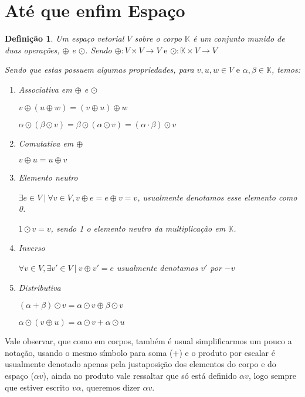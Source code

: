 \documentclass{article}
\newtheorem{definition}{Definição}[section]
\newcommand{\KK}{\mathbb{K} }
\begin{document}
\section{Até que enfim Espaço}

\begin{definition}

Um espaço vetorial $V$ sobre o corpo $\KK$ é um conjunto munido de duas operações, $\oplus$ e $\odot$. Sendo $\oplus: V \times V \to V \text{ e } \odot: \KK \times V \to V$



Sendo que estas possuem algumas propriedades, para $v,u,w \in V \text{ e } \alpha, \beta \in \KK$, temos:

\begin{enumerate}
    \item Associativa em $\oplus$ e $\odot$
    
        $v \oplus (u \oplus w) = (v \oplus u) \oplus w $
        
        $\alpha \odot (\beta \odot v) = \beta \odot (\alpha \odot v) = (\alpha \cdot \beta)\odot v$
    \item Comutativa em $\oplus$
    
        $v \oplus u = u \oplus v$
    \item Elemento neutro
    
     $\exists e \in V \ | \  \forall v \in V, v \oplus e = e \oplus v = v$, usualmente denotamos esse elemento como 0.
     
     $1 \odot v = v$, sendo 1 o elemento neutro da multiplicação em $\KK$.
     
     \item Inverso
     
     $\forall v \in V , \exists v' \in V \ | \ v \oplus v' = e$ usualmente denotamos $v'$ por $-v$ 
    \item Distributiva
    
    $(\alpha + \beta)\odot v = \alpha \odot v \oplus \beta \odot v$
    
    $\alpha \odot (v \oplus u)= \alpha \odot v + \alpha \odot u$
\end{enumerate}
\end{definition}

Vale observar, que como em corpos, também é usual simplificarmos um pouco a notação, usando o mesmo símbolo para soma (+) e o produto por escalar é usualmente denotado apenas pela justaposição dos elementos do corpo e do espaço ($\alpha v$), ainda no produto vale ressaltar que só está definido $\alpha v$, logo sempre que estiver escrito $v \alpha$, queremos dizer $\alpha v$.
\end{document}

